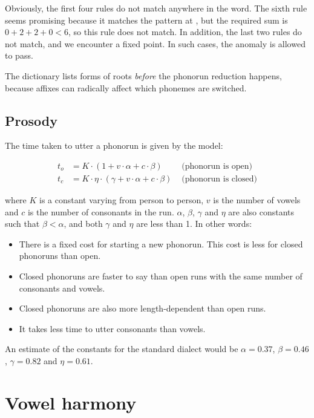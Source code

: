 \documentclass{book}
\begin{document}
Obviously, the first four rules do not match anywhere in the word. The sixth rule seems promising because it matches the pattern at , but the required sum is $0 + 2 + 2 + 0 < 6$, so this rule does not match. In addition, the last two rules do not match, and we encounter a fixed point. In such cases, the anomaly is allowed to pass.

The dictionary lists forms of roots \emph{before} the phonorun reduction happens, because affixes can radically affect which phonemes are switched.

\subsection{Prosody}

The time taken to utter a phonorun is given by the model:

\begin{align}
  t_o &= K \cdot (1 + v \cdot \alpha + c \cdot \beta) & \text{ (phonorun is open)} \\
  t_c &= K \cdot \eta \cdot (\gamma + v \cdot \alpha + c \cdot \beta) & \text{ (phonorun is closed)}
\end{align}

where $K$ is a constant varying from person to person, $v$ is the number of vowels and $c$ is the number of consonants in the run. $\alpha$, $\beta$, $\gamma$ and $\eta$ are also constants such that $\beta < \alpha$, and both $\gamma$ and $\eta$ are less than 1. In other words:

\begin{itemize}
  \item There is a fixed cost for starting a new phonorun. This cost is less for closed phonoruns than open.
  \item Closed phonoruns are faster to say than open runs with the same number of consonants and vowels.
  \item Closed phonoruns are also more length-dependent than open runs.
  \item It takes less time to utter consonants than vowels.
\end{itemize}

An estimate of the constants for the standard dialect would be $\alpha = 0.37$, $\beta = 0.46$, $\gamma = 0.82$ and $\eta = 0.61$.

\section{Vowel harmony}
\end{document}

